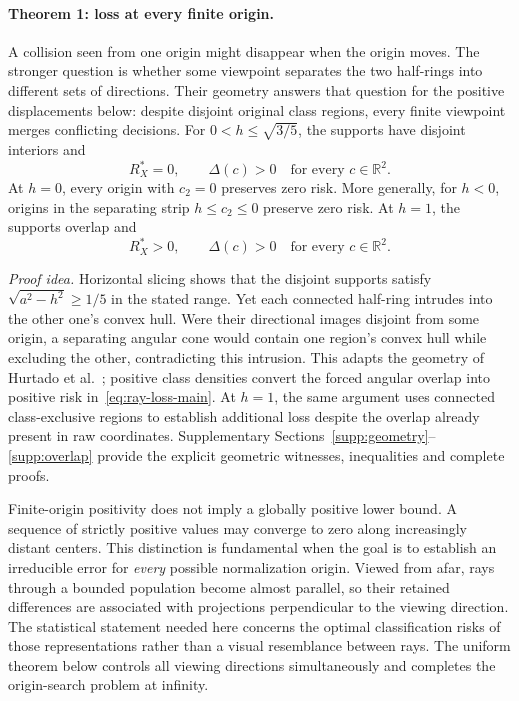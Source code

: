 \paragraph{Theorem 1: loss at every finite origin.}
A collision seen from one origin might disappear when the origin moves. The stronger question is whether some viewpoint separates the two half-rings into different sets of directions. Their geometry answers that question for the positive displacements below: despite disjoint original class regions, every finite viewpoint merges conflicting decisions. For $0<h\leq\sqrt{3/5}$, the supports have disjoint interiors and
\begin{equation}
 R_X^*=0,\qquad \Delta(c)>0
 \quad\text{for every }c\in\mathbb R^2.
 \label{eq:all-origin-disjoint}
\end{equation}
At $h=0$, every origin with $c_2=0$ preserves zero risk. More generally, for $h<0$, origins in the separating strip $h\leq c_2\leq0$ preserve zero risk. At $h=1$, the supports overlap and
\begin{equation}
 R_X^*>0,\qquad \Delta(c)>0
 \quad\text{for every }c\in\mathbb R^2.
 \label{eq:all-origin-overlap}
\end{equation}

\emph{Proof idea.}
Horizontal slicing shows that the disjoint supports satisfy $\sqrt{a^2-h^2}\geq1/5$ in the stated range. Yet each connected half-ring intrudes into the other one's convex hull. Were their directional images disjoint from some origin, a separating angular cone would contain one region's convex hull while excluding the other, contradicting this intrusion. This adapts the geometry of Hurtado et al.~\citep{Hurtado2001}; positive class densities convert the forced angular overlap into positive risk in~\eqref{eq:ray-loss-main}. At $h=1$, the same argument uses connected class-exclusive regions to establish additional loss despite the overlap already present in raw coordinates. Supplementary Sections~\ref{supp:geometry}--\ref{supp:overlap} provide the explicit geometric witnesses, inequalities and complete proofs.

Finite-origin positivity does not imply a globally positive lower bound. A sequence of strictly positive values may converge to zero along increasingly distant centers. This distinction is fundamental when the goal is to establish an irreducible error for \emph{every} possible normalization origin. Viewed from afar, rays through a bounded population become almost parallel, so their retained differences are associated with projections perpendicular to the viewing direction. The statistical statement needed here concerns the optimal classification risks of those representations rather than a visual resemblance between rays. The uniform theorem below controls all viewing directions simultaneously and completes the origin-search problem at infinity.

